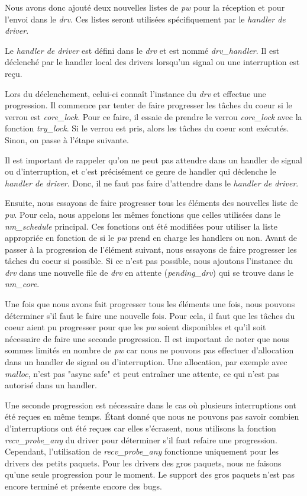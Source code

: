 Nous avons donc ajouté deux nouvelles listes de \emph{pw} pour la réception et pour l'envoi dans le \emph{drv}.
Ces listes seront utilisées spécifiquement par le \emph{handler de driver}.

Le \emph{handler de driver} est défini dans le \emph{drv} et est nommé \emph{drv_handler}.
Il est déclenché par le handler local des drivers lorsqu'un signal ou une interruption est reçu.

Lors du déclenchement, celui-ci connaît l'instance du \emph{drv} et effectue une progression.
Il commence par tenter de faire progresser les tâches du coeur si le verrou est \emph{core_lock}.
Pour ce faire, il essaie de prendre le verrou \emph{core_lock} avec la fonction \emph{try_lock}.
Si le verrou est pris, alors les tâches du coeur sont exécutés. Sinon, on passe à l'étape suivante.

Il est important de rappeler qu'on ne peut pas attendre dans un handler de signal ou d'interruption,
et c'est précisément ce genre de handler qui déclenche le \emph{handler de driver}.
Donc, il ne faut pas faire d'attendre dans le \emph{handler de driver}.

Ensuite, nous essayons de faire progresser tous les éléments des nouvelles liste de \emph{pw}.
Pour cela, nous appelons les mêmes fonctions que celles utilisées dans le \emph{nm_schedule} principal.
Ces fonctions ont été modifiées pour utiliser la liste appropriée en fonction de si le \emph{pw} prend en charge les handlers ou non.
Avant de passer à la progression de l'élément suivant, nous essayons de faire progresser les tâches du coeur si possible.
Si ce n'est pas possible, nous ajoutons l'instance du \emph{drv} dans une nouvelle file de \emph{drv} en attente (\emph{pending_drv}) qui se trouve dans le \emph{nm_core}.

Une fois que nous avons fait progresser tous les éléments une fois, nous pouvons déterminer s'il faut le faire une nouvelle fois.
Pour cela, il faut que les tâches du coeur aient pu progresser pour que les \emph{pw} soient disponibles et qu'il soit nécessaire de faire une seconde progression.
Il est important de noter que nous sommes limités en nombre de \emph{pw} car nous ne pouvons pas effectuer d'allocation dans un handler de signal ou d'interruption.
Une allocation, par exemple avec \emph{malloc}, n'est pas "async safe" et peut entraîner une attente,
ce qui n'est pas autorisé dans un handler.

Une seconde progression est nécessaire dans le cas où plusieurs interruptions ont été reçues en même temps.
Étant donné que nous ne pouvons pas savoir combien d'interruptions ont été reçues car elles s'écrasent,
nous utilisons la fonction \emph{recv_probe_any} du driver pour déterminer s'il faut refaire une progression.
Cependant, l'utilisation de \emph{recv_probe_any} fonctionne uniquement pour les drivers des petits paquets.
Pour les drivers des gros paquets, nous ne faisons qu'une seule progression pour le moment.
Le support des gros paquets n'est pas encore terminé et présente encore des bugs.

